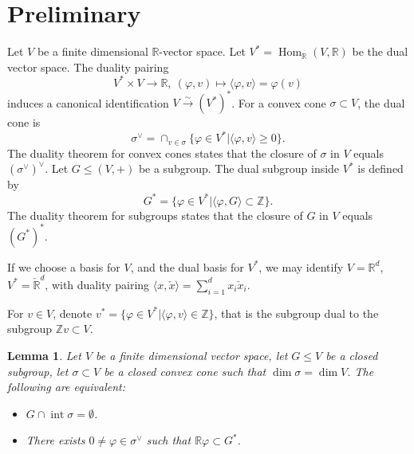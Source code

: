 \documentclass[12pt,reqno]{amsart}
\newcommand{\isoto}{{\overset{\sim}{\rightarrow}}}
\newcommand{\Z}{{\mathbb Z}}
\newcommand{\R}{{\mathbb R}}
\newcommand{\Hom}{\operatorname{Hom}}
\newcommand{\Int}{\operatorname{int}}
\theoremstyle{plain}
\newtheorem{lem}[thm]{Lemma}
\theoremstyle{definition}
\theoremstyle{remark}
\begin{document}
\section{Preliminary}


Let $V$ be a finite dimensional $\R$-vector space.
Let $V^*=\Hom_\R(V,\R)$ be the dual vector space. The duality pairing 
$$
V^*\times V\to \R, \ (\varphi,v)\mapsto \langle \varphi,v\rangle=\varphi(v)
$$ induces a canonical identification
$V\isoto (V^*)^*$. For a convex cone $\sigma\subset V$, the dual cone 
is 
$$
\sigma^\vee=\cap_{v\in \sigma}\{\varphi\in V^* \vert \langle \varphi,v\rangle\ge 0\}.
$$ 
The duality theorem for convex cones states that 
the closure of $\sigma$ in $V$ equals $(\sigma^\vee)^\vee$.
Let $G\le (V,+)$ be a subgroup. The dual subgroup inside $V^*$ is defined by 
$$
G^*=\{\varphi\in V^* \vert \langle \varphi,G\rangle\subset \Z\}.
$$
The duality theorem for subgroups states that the closure of $G$ in $V$ equals $(G^*)^*$.

If we choose a basis for $V$, and the dual basis for $V^*$, we may identify $V=\R^d$, $V^*=\check{\R}^d$, with duality pairing 
$\langle x,\check{x}\rangle=\sum_{i=1}^dx_i\check{x}_i$.

For $v\in V$, denote $v^*=\{\varphi\in V^*\vert \langle \varphi,v\rangle\in \Z\}$, that is the subgroup dual to the subgroup $\Z v\subset V$.

\begin{lem}\label{co}
	Let $V$ be a finite dimensional vector space, let $G\le V$ be a closed subgroup, let $\sigma\subset V$ be a closed convex cone such that $\dim \sigma=\dim V$. The following are equivalent:
	\begin{itemize}
		\item[(1)] $G\cap \Int \sigma=\emptyset$. 
		\item[(2)] There exists $0\ne \varphi\in \sigma^\vee$ such that
		$\R \varphi\subset G^*$.
	\end{itemize}
\end{lem}
\end{document}
